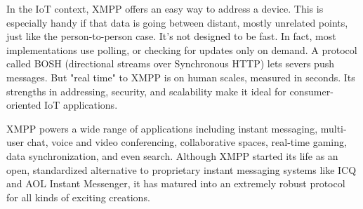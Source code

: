       In the IoT context, XMPP offers an easy way to address a device. This is especially handy if that data is going between distant, mostly unrelated points, just like the person-to-person case. It’s not designed to be fast. In fact, most implementations use polling, or checking for updates only on demand. A protocol called BOSH (directional streams over Synchronous HTTP) lets severs push messages. But "real time" to XMPP is on human scales, measured in seconds. Its strengths in addressing, security, and scalability make it ideal for consumer-oriented IoT applications.

      XMPP powers a wide range of applications including instant messaging, multi-user chat, voice and video conferencing, collaborative spaces, real-time gaming, data synchronization, and even search. Although XMPP started its life as an open, standardized alternative to proprietary instant messaging systems like ICQ and AOL Instant Messenger, it has matured into an extremely robust protocol for all kinds of exciting creations.

